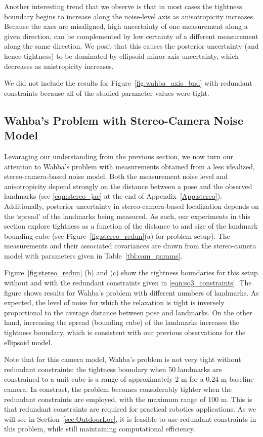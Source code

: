 \documentclass[lettersize,journal]{IEEEtran}
\newcommand{\rev}[1]{\color{red}{#1}\color{black}}
\begin{document}
Another interesting trend that we observe is that in most cases the tightness boundary begins to increase along the noise-level axis as anisotropicity increases. Because the axes are misaligned, high uncertainty of one measurement along a given direction, can be complemented by low certainty of a different measurement along the same direction. We posit that this causes the posterior uncertainty (and hence tightness) to be dominated by ellipsoid minor-axis uncertainty, which decreases as anistropicity increases. 

We did not include the results for Figure~\ref{fig:wahba_axis_bnd} with redundant constraints because all of the studied parameter values were tight. 


\subsection{Wahba's Problem with Stereo-Camera Noise Model}\label{sec:SimWahbaStereo}

Levaraging our understanding from the previous section, we now turn our attention to Wahba's problem with measurements obtained from a less idealized, stereo-camera-based noise model. Both the measurement noise level and anisotropicity depend strongly on the distance between a pose and the observed landmarks (see \eqref{eqn:stereo_jac} at the end of Appendix~\ref{App:stereo}). Additionally, posterior uncertainty in stereo-camera-based localization depends on the `spread' of the landmarks being measured. As such, our experiments in this section explore tightness as a function of the distance to and size of the landmark bounding cube (see Figure~\ref{fig:stereo_redun}(a) for problem setup). The measurements and their associated covariances are drawn from the stereo-camera model with parameters given in Table~\ref{tbl:cam_params}.

Figure~\ref{fig:stereo_redun} (b) and (c) show the tightness boundaries for this setup without and with the redundant constraints given in \eqref{eqn:so3_constraints}. 
The figure shows results for Wahba's problem with different numbers of landmarks. As expected, the level of noise for which the relaxation is tight is inversely proportional to the average distance between pose and landmarks. On the other hand, increasing the spread (bounding cube) of the landmarks increases the tightness boundary, which is consistent with our previous observations for the ellipsoid model. 

Note that for this camera model, Wahba's problem is not very tight without redundant constraints: the tightness boundary when 50 landmarks are constrained to a unit cube is a range of approximately 2 m for a 0.24 m baseline camera. In constrast, the problem becomes considerably tighter when the redundant constraints are employed, with the maximum range of 100 m. This is \rev{indicates } that redundant constraints are required for practical robotics applications. As we will see in Section~\ref{sec:OutdoorLoc}, it is feasible to use redundant constraints in this problem, while still maintaining computational efficiency. 
\end{document}
